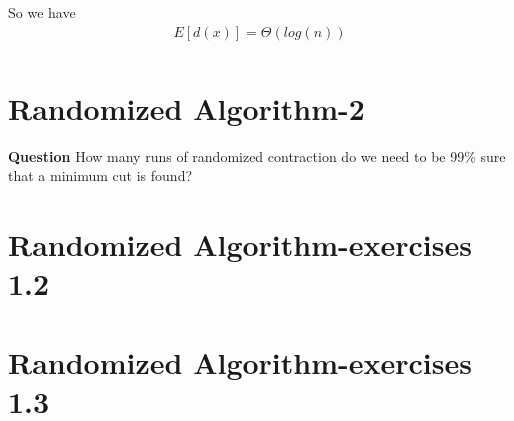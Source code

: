 \documentclass[12pt]{article}
\begin{document}
So we have
\begin{equation}
\begin{aligned}
E[d(x)] = \Theta(log(n))\\
\end{aligned}
\end{equation}


\section{Randomized Algorithm-2}
\textbf{Question}
How many runs of randomized contraction do we need to be 99\% sure that a minimum cut is found?

\section{Randomized Algorithm-exercises 1.2}

\section{Randomized Algorithm-exercises 1.3}
\end{document}

